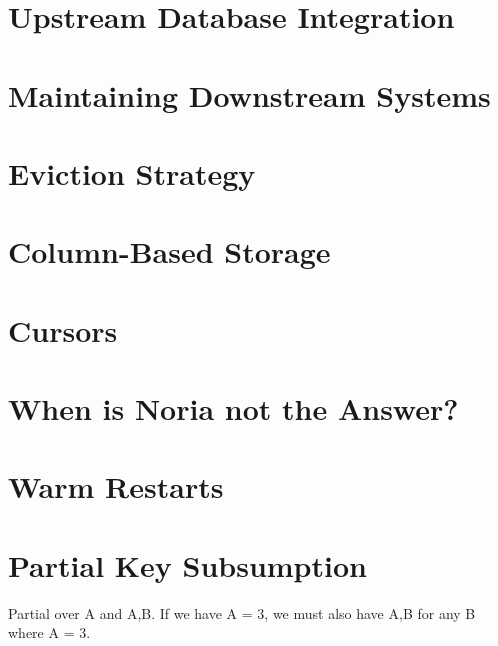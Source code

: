 \section{Upstream Database Integration}

\section{Maintaining Downstream Systems}

\section{Eviction Strategy}

\section{Column-Based Storage}

\section{Cursors}

\section{When is Noria not the Answer?}

\section{Warm Restarts}

\section{Partial Key Subsumption}

Partial over A and A,B. If we have A = 3, we must also have A,B for any B where
A = 3.
